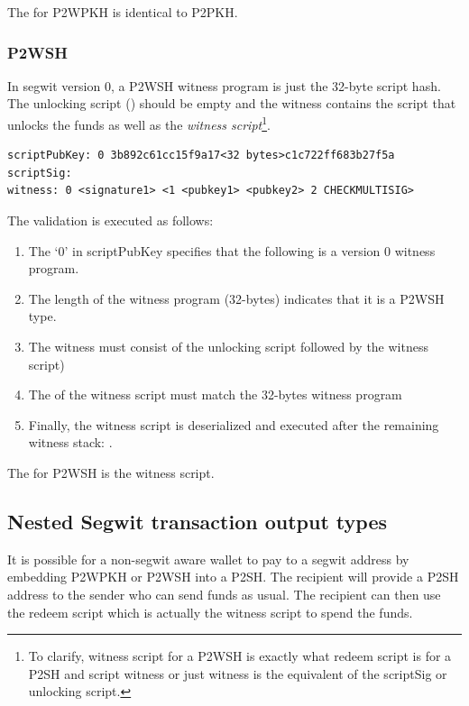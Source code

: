 The  for P2WPKH is identical to P2PKH.


\subsubsection*{P2WSH}
In segwit version 0, a P2WSH witness program is just the 32-byte script hash. The unlocking script () should be empty and the witness contains the script that unlocks the funds as well as the \emph{witness script}\footnote{To clarify, witness script for a P2WSH is exactly what redeem script is for a P2SH and script witness or just witness is the equivalent of the scriptSig or unlocking script.}.

\begin{emphbox}
\begin{lstlisting}[style=Pseudomath]
scriptPubKey: 0 3b892c61cc15f9a17<32 bytes>c1c722ff683b27f5a
scriptSig:
witness: 0 <signature1> <1 <pubkey1> <pubkey2> 2 CHECKMULTISIG>
\end{lstlisting}
\end{emphbox}

The validation is executed as follows:
\begin{enumerate}
\item The `0' in scriptPubKey specifies that the following is a version 0 witness program.
\item The length of the witness program (32-bytes) indicates that it is a P2WSH type.
\item The witness must consist of the unlocking script followed by the witness script) 
\item The  of the witness script must match the 32-bytes witness program
\item Finally, the witness script is deserialized and executed after the remaining witness stack: .
\end{enumerate}

The  for P2WSH is the witness script.


\subsection*{Nested Segwit transaction output types}
It is possible for a non-segwit aware wallet to pay to a segwit address by embedding P2WPKH or P2WSH into a P2SH. The recipient will provide a P2SH address to the sender who can send funds as usual. The recipient can then use the redeem script which is actually the witness script to spend the funds.

